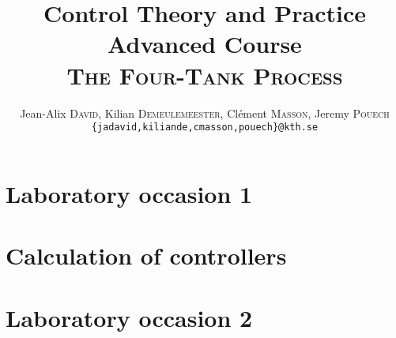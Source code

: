 \documentclass[a4paper,8pt,twocolumn]{extarticle}
\title{Control Theory and Practice \\ Advanced Course \\ \textsc{The Four-Tank Process}}
\author{Jean-Alix \textsc{David}, Kilian \textsc{Demeulemeester}, Clément \textsc{Masson}, Jeremy \textsc{Pouech} \\ \texttt{\{jadavid,kiliande,cmasson,pouech\}@kth.se}}
\begin{document}
\setlength\parindent{0em}

\maketitle




\section{Laboratory occasion 1}





\section{Calculation of controllers}

\setcounter{subsection}{1}

\setcounter{subsection}{-1}

\section{Laboratory occasion 2}






\end{document}
